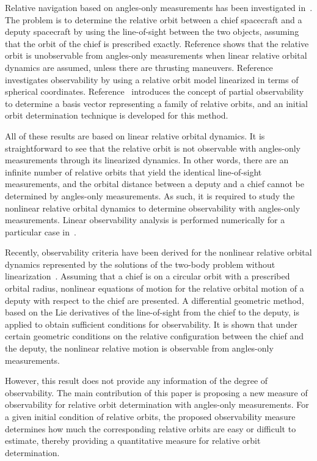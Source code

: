 \documentclass[letterpaper, paper,10pt]{AAS}		%
\begin{document}
Relative navigation based on angles-only measurements has been investigated in~\cite{WofGelITAES09,Tom11,PatLovPASFMM12}.  The problem is to determine the relative orbit between a chief spacecraft and a deputy spacecraft by using the line-of-sight between the two objects, assuming that the orbit of the chief is prescribed exactly.  Reference \cite{WofGelITAES09} shows that the relative orbit is unobservable from angles-only measurements when linear relative orbital dynamics are assumed, unless there are thrusting maneuvers. Reference \cite{Tom11} investigates observability by using a relative orbit model linearized in terms of spherical coordinates.  Reference~\cite{PatLovPASFMM12} introduces the concept of partial observability to determine a basis vector representing a family of relative orbits, and an initial orbit determination technique is developed for this method.

All of these results are based on linear relative orbital dynamics. It is straightforward to see that the relative orbit is not observable with angles-only measurements through its linearized dynamics. In other words, there are an infinite number of relative orbits that yield the identical line-of-sight measurements, and the orbital distance between a deputy and a chief cannot be determined by angles-only measurements. As such, it is required to study the nonlinear relative orbital dynamics to determine observability with angles-only measurements. Linear observability analysis is performed numerically for a particular case in~\cite{YimCraPASMM04}. 

Recently, observability criteria have been derived for the nonlinear relative orbital dynamics represented by the solutions of the two-body problem without linearization~\cite{LovLeePISSFD14}.  Assuming that a chief is on a circular orbit with a prescribed orbital radius, nonlinear equations of motion for the relative orbital motion of a deputy with respect to the chief are presented.  A differential geometric method, based on the Lie derivatives of the line-of-sight from the chief to the deputy, is applied to obtain sufficient conditions for observability.  It is shown that under certain geometric conditions on the relative configuration between the chief and the deputy, the nonlinear relative motion is observable from angles-only measurements.  

However, this result does not provide any information of the degree of observability. The main contribution of this paper is proposing a new  measure of observability for relative orbit determination with angles-only measurements. For a given initial condition of relative orbits, the proposed observability measure determines how much the corresponding relative orbits are easy or difficult to estimate, thereby providing a quantitative measure for relative orbit determination.
\end{document}
